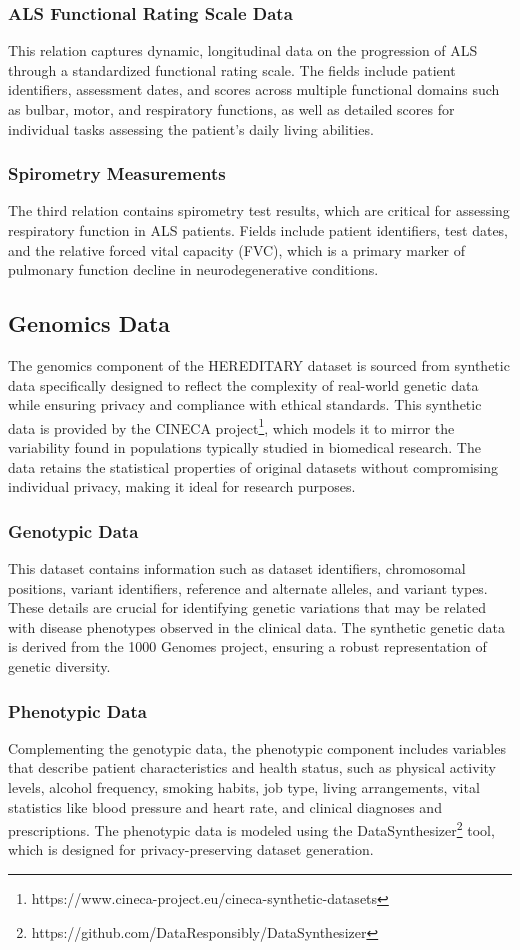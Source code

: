 \subsubsection{ALS Functional Rating Scale Data}
This relation captures dynamic, longitudinal data on the progression of \ac{ALS} through a standardized functional rating scale. The fields include patient identifiers, assessment dates, and scores across multiple functional domains such as bulbar, motor, and respiratory functions, as well as detailed scores for individual tasks assessing the patient's daily living abilities. 
\subsubsection{Spirometry Measurements}
The third relation contains spirometry test results, which are critical for assessing respiratory function in \ac{ALS} patients. Fields include patient identifiers, test dates, and the relative forced vital capacity (FVC), which is a primary marker of pulmonary function decline in neurodegenerative conditions.
\subsection{Genomics Data}
The genomics component of the \ac{HEREDITARY} dataset is sourced from synthetic data specifically designed to reflect the complexity of real-world genetic data while ensuring privacy and compliance with ethical standards. This synthetic data is provided by the CINECA project\footnote{https://www.cineca-project.eu/cineca-synthetic-datasets}, which models it to mirror the variability found in populations typically studied in biomedical research. The data retains the statistical properties of original datasets without compromising individual privacy, making it ideal for research purposes.
\subsubsection{Genotypic Data}
This dataset contains information such as dataset identifiers, chromosomal positions, variant identifiers, reference and alternate alleles, and variant types. These details are crucial for identifying genetic variations that may be related with disease phenotypes observed in the clinical data. The synthetic genetic data is derived from the 1000 Genomes project, ensuring a robust representation of genetic diversity.
\subsubsection{Phenotypic Data}
Complementing the genotypic data, the phenotypic component includes variables that describe patient characteristics and health status, such as physical activity levels, alcohol frequency, smoking habits, job type, living arrangements, vital statistics like blood pressure and heart rate, and clinical diagnoses and prescriptions. The phenotypic data is modeled using the DataSynthesizer\footnote{https://github.com/DataResponsibly/DataSynthesizer} tool, which is designed for privacy-preserving dataset generation.
